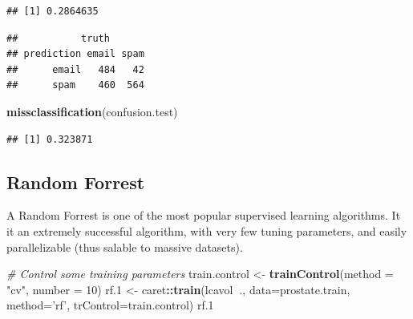 \documentclass[]{book}
\newenvironment{Shaded}{\begin{snugshade}}{\end{snugshade}}
\newcommand{\KeywordTok}[1]{\textcolor[rgb]{0.13,0.29,0.53}{\textbf{#1}}}
\newcommand{\DataTypeTok}[1]{\textcolor[rgb]{0.13,0.29,0.53}{#1}}
\newcommand{\DecValTok}[1]{\textcolor[rgb]{0.00,0.00,0.81}{#1}}
\newcommand{\StringTok}[1]{\textcolor[rgb]{0.31,0.60,0.02}{#1}}
\newcommand{\CommentTok}[1]{\textcolor[rgb]{0.56,0.35,0.01}{\textit{#1}}}
\newcommand{\OperatorTok}[1]{\textcolor[rgb]{0.81,0.36,0.00}{\textbf{#1}}}
\newcommand{\NormalTok}[1]{#1}
\theoremstyle{definition}
\theoremstyle{definition}
\theoremstyle{definition}
\theoremstyle{remark}
\begin{document}
\begin{verbatim}
## [1] 0.2864635
\end{verbatim}

\begin{Shaded}
\end{Shaded}

\begin{verbatim}
##           truth
## prediction email spam
##      email   484   42
##      spam    460  564
\end{verbatim}

\begin{Shaded}
\begin{Highlighting}[]
\KeywordTok{missclassification}\NormalTok{(confusion.test)}
\end{Highlighting}
\end{Shaded}

\begin{verbatim}
## [1] 0.323871
\end{verbatim}

\subsection{Random Forrest}\label{random-forrest}

A Random Forrest is one of the most popular supervised learning
algorithms. It it an extremely successful algorithm, with very few
tuning parameters, and easily parallelizable (thus salable to massive
datasets).

\begin{Shaded}
\begin{Highlighting}[]
\CommentTok{# Control some training parameters}
\NormalTok{train.control <-}\StringTok{ }\KeywordTok{trainControl}\NormalTok{(}\DataTypeTok{method =} \StringTok{"cv"}\NormalTok{, }\DataTypeTok{number =} \DecValTok{10}\NormalTok{)}
\NormalTok{rf.}\DecValTok{1}\NormalTok{ <-}\StringTok{ }\NormalTok{caret}\OperatorTok{::}\KeywordTok{train}\NormalTok{(lcavol}\OperatorTok{~}\NormalTok{., }\DataTypeTok{data=}\NormalTok{prostate.train, }
                \DataTypeTok{method=}\StringTok{'rf'}\NormalTok{, }
                \DataTypeTok{trControl=}\NormalTok{train.control)}
\NormalTok{rf.}\DecValTok{1}
\end{Highlighting}
\end{Shaded}
\end{document}
